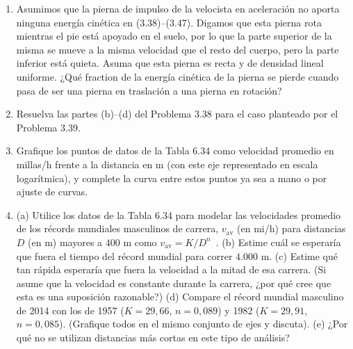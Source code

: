 \documentclass[12pt]{book}
\begin{document}
\begin{enumerate}
\item[3.39] Asumimos que la pierna de impulso de la velocista en aceleración no aporta ninguna energía cinética en (3.38)--(3.47). Digamos que esta pierna rota mientras el pie está apoyado en el suelo, por lo que la parte superior de la misma se mueve a la misma velocidad que el resto del cuerpo, pero la parte inferior está quieta. Asuma que esta pierna es recta y de densidad lineal uniforme. ¿Qué fraction de la energía cinética de la pierna se pierde cuando pasa de ser una pierna en traslación a una pierna en rotación?

\item[3.40] Resuelva las partes (b)--(d) del Problema 3.38 para el caso planteado por el Problema 3.39.

\item[3.41] Grafique los puntos de datos de la Tabla 6.34 como velocidad promedio en millas/h frente a la distancia en m (con este eje representado en escala logarítmica), y complete la curva entre estos puntos ya sea a mano o por ajuste de curvas.

\item[3.42] (a) Utilice los datos de la Tabla 6.34 para modelar las velocidades promedio de los récords mundiales masculinos de carrera, $v_{\text{av}}$ (en mi/h) para distancias $D$ (en m) mayores a $400\text{ m}$ como $v_{\text{av}} = K/D^n$~\cite{ref16}.
(b) Estime cuál se esperaría que fuera el tiempo del récord mundial para correr $4.000\text{ m}$.
(c) Estime qué tan rápida esperaría que fuera la velocidad a la mitad de esa carrera. (Si asume que la velocidad es constante durante la carrera, ¿por qué cree que esta es una suposición razonable?)
(d) Compare el récord mundial masculino de 2014 con los de 1957 ($K = 29{,}66$, $n = 0{,}089$) y 1982 ($K = 29{,}91$, $n = 0{,}085$). (Grafique todos en el mismo conjunto de ejes y discuta).
(e) ¿Por qué no se utilizan distancias más cortas en este tipo de análisis?


\end{enumerate}
\end{document}
